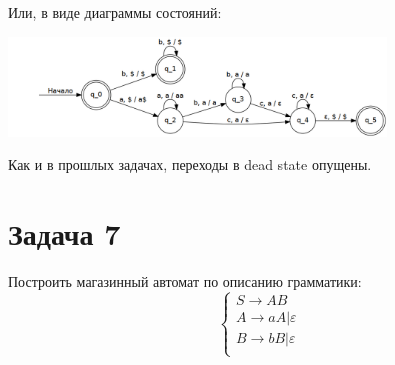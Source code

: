 \documentclass[11pt]{article}
\begin{document}
Или, в виде диаграммы состояний:
\begin{center}
\includegraphics[height=100px]{diag3.png}
\end{center}

Как и в прошлых задачах, переходы в dead state опущены.
\section{Задача 7}
\label{sec:orgd9e22b2}
Построить магазинный автомат по описанию грамматики:
\begin{equation}
\begin{cases}
S \rightarrow AB \\
A \rightarrow aA | \varepsilon \\
B \rightarrow bB | \varepsilon \\
\end{cases}
\end{equation}
\end{document}
